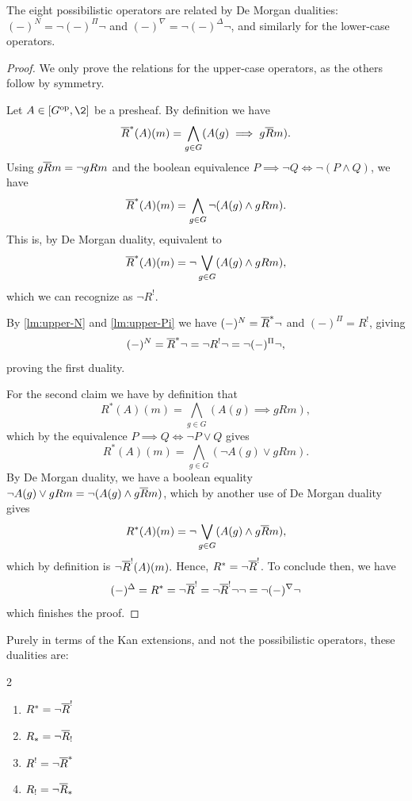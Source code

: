 \begin{lemma}
    \label{lm:De-Morgan-duality}
    The eight possibilistic operators are related by De Morgan dualities: $(-)^N = \neg (-)^\Pi \neg$ and $(-)^\nabla = \neg (-)^\Delta \neg$, and similarly for the lower-case operators. 
\end{lemma}
\begin{proof}
    We only prove the relations for the upper-case operators, as the others follow by symmetry. 

    Let $A\in [G\op, \2]$ be a presheaf. By definition we have 
    \[\overline{R}^*(A)(m) = \bigwedge_{g\in G}(A(g)\implies g\overline{R} m).\]
    Using $g \overline{R} m = \neg gRm$ and the boolean equivalence $P\implies \neg Q \iff \neg (P\wedge Q)$, we have 
    \[\overline{R}^*(A)(m) = \bigwedge_{g\in G}\neg (A(g)\wedge g R m).\]
    This is, by De Morgan duality, equivalent to 
    \[\overline{R}^*(A)(m) = \neg\bigvee_{g\in G}(A(g)\wedge g R m),\]
    which we can recognize as $\neg R^!$. 

    By \cref{lm:upper-N} and \cref{lm:upper-Pi} we have $(-)^N = \overline{R}^*\neg$ and $(-)^\Pi = R^!$, giving 
    \[(-)^N = \overline{R}^*\neg = \neg R^!\neg = \neg (-)^\Pi\neg,\]
    proving the first duality. 

    For the second claim we have by definition that 
    \[R^*(A)(m) = \bigwedge_{g\in G}(A(g)\implies gRm),\]
    which by the equivalence $P\implies Q \iff \neg P\vee Q$ gives 
    \[R^*(A)(m) = \bigwedge_{g\in G}(\neg A(g)\vee gRm).\]
    By De Morgan duality, we have a boolean equality $\neg A(g)\vee gRm = \neg(A(g)\wedge g\overline{R} m)$, which by another use of De Morgan duality gives 
    \[R^*(A)(m) = \neg\bigvee_{g\in G}(A(g)\wedge g\overline{R} m),\]
    which by definition is $\neg \overline{R}^!(A)(m).$ Hence, $R^* = \neg \overline{R}^!$. To conclude then, we have
    \[(-)^\Delta = R^* =\neg\overline{R}^! = \neg \overline{R}^! \neg\neg = \neg (-)^\nabla \neg\] 
    which finishes the proof. 
\end{proof}

\begin{remark}
    Purely in terms of the Kan extensions, and not the possibilistic operators, these dualities are: 
    \begin{multicols}{2}
    \begin{enumerate}
        \item $R^* = \neg \overline{R}^!$
        \item $R_* = \neg \overline{R}_!$
        \item $R^! = \neg \overline{R}^*$
        \item $R_! = \neg \overline{R}_*$
    \end{enumerate}
    \end{multicols}
\end{remark}

